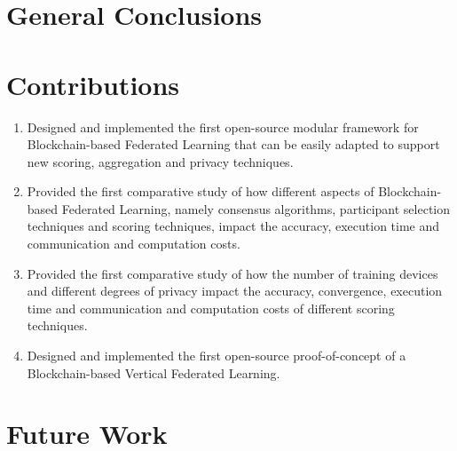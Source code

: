     
\section{General Conclusions}

\section{Contributions}

\begin{enumerate}
    \item Designed and implemented the first open-source modular framework for Blockchain-based Federated Learning that can be easily adapted to support new scoring, aggregation and privacy techniques.
    
    \item Provided the first comparative study of how different aspects of Blockchain-based Federated Learning, namely consensus algorithms, participant selection techniques and scoring techniques, impact the accuracy, execution time and communication and computation costs.
    
    \item Provided the first comparative study of how the number of training devices and different degrees of privacy impact the accuracy, convergence, execution time and communication and computation costs of different scoring techniques.
    
    \item Designed and implemented the first open-source proof-of-concept of a Blockchain-based Vertical Federated Learning.
\end{enumerate}

\section{Future Work}